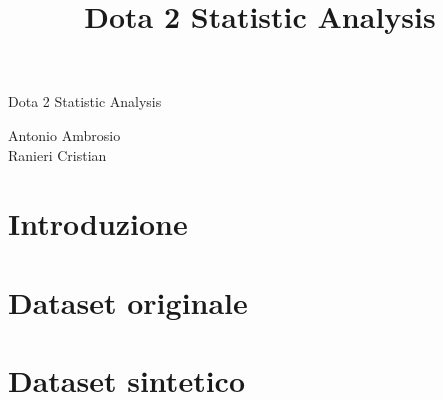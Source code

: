 \documentclass[12pt, a4paper]{article}
\title{Dota 2 Statistic Analysis}
\begin{document}


\begin{titlepage}
\centering
\vspace{1cm}

\sffamily

{\Huge Dota 2 Statistic Analysis \par}
{\Large Antonio Ambrosio \\ Ranieri Cristian\par}

\rmfamily

\end{titlepage}


\tableofcontents
\newpage

\section{Introduzione}

\newpage

\section{Dataset originale}

\newpage

\section{Dataset sintetico}

\newpage


\nocite{*}
\printbibliography[title={Bibliografia}] 
\end{document}
